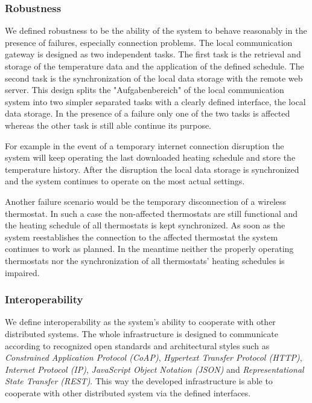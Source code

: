 \subsubsection{Robustness}

We defined robustness to be the ability of the system to behave reasonably in the presence of failures, especially connection problems.
The local communication gateway is designed as two independent tasks.
The first task is the retrieval and storage of the temperature data and the application of the defined schedule.
The second task is the synchronization of the local data storage with the remote web server.
This design splits the "Aufgabenbereich" of the local communication system into two simpler separated tasks with a clearly defined interface, the local data storage.
In the presence of a failure only one of the two tasks is affected whereas the other task is still able continue its purpose.

For example in the event of a temporary internet connection disruption the system will keep operating the last downloaded heating schedule and store the temperature history.
After the disruption the local data storage is synchronized and the system continues to operate on the most actual settings.

Another failure scenario would be the temporary disconnection of a wireless thermostat.
In such a case the non-affected thermostats are still functional and the heating schedule of all thermostats is kept synchronized.
As soon as the system reestablishes the connection to the affected thermostat the system continues to work as planned.
In the meantime neither the properly operating thermostats nor the synchronization of all thermostats' heating schedules is impaired.







\subsubsection{Interoperability}

We define interoperability as the system's ability to cooperate with other distributed systems.
The whole infrastructure is designed to communicate according to recognized open standards and architectural styles such as \emph{Constrained Application Protocol (CoAP)}, \emph{Hypertext Transfer Protocol (HTTP)}, \emph{Internet Protocol (IP)}, \emph{JavaScript Object Notation (JSON)} and \emph{Representational State Transfer (REST)}.
This way the developed infrastructure is able to cooperate with other distributed system via the defined interfaces.


